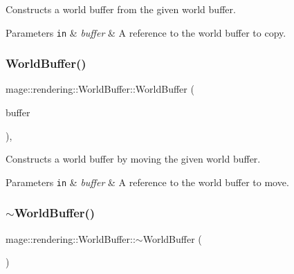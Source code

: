 Constructs a world buffer from the given world buffer.


\begin{DoxyParams}[1]{Parameters}
\mbox{\tt in}  & {\em buffer} & A reference to the world buffer to copy. \\
\hline
\end{DoxyParams}
\mbox{\label{structmage_1_1rendering_1_1_world_buffer_ab5cce49c9fe1bbe5e7db5f98df3dbf1a}} 
\subsubsection{\texorpdfstring{World\+Buffer()}{WorldBuffer()}\hspace{0.1cm}{\footnotesize\ttfamily [3/3]}}
{\footnotesize\ttfamily mage\+::rendering\+::\+World\+Buffer\+::\+World\+Buffer (\begin{DoxyParamCaption}\item[{\mbox{\hyperlink{structmage_1_1rendering_1_1_world_buffer}{World\+Buffer}} \&\&}]{buffer }\end{DoxyParamCaption})\hspace{0.3cm}{\ttfamily [default]}, {\ttfamily [noexcept]}}

Constructs a world buffer by moving the given world buffer.


\begin{DoxyParams}[1]{Parameters}
\mbox{\tt in}  & {\em buffer} & A reference to the world buffer to move. \\
\hline
\end{DoxyParams}
\mbox{\label{structmage_1_1rendering_1_1_world_buffer_afdfdecc619400706fa89e24f3ce14a43}} 
\subsubsection{\texorpdfstring{$\sim$\+World\+Buffer()}{~WorldBuffer()}}
{\footnotesize\ttfamily mage\+::rendering\+::\+World\+Buffer\+::$\sim$\+World\+Buffer (\begin{DoxyParamCaption}{ }\end{DoxyParamCaption})\hspace{0.3cm}{\ttfamily [default]}}

